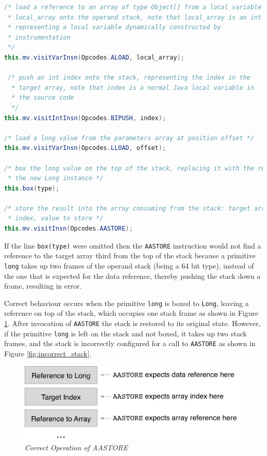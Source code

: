 \documentclass[]{final_report}
\begin{document}
\begin{lstlisting}[language=java,caption=Boxing a Primitive to a Reference in ASM, label={boxing}]
/* load a reference to an array of type Object[] from a local variable
 * local_array onto the operand stack, note that local_array is an int
 * representing a local variable dynamically constructed by
 * instrumentation
 */
this.mv.visitVarInsn(Opcodes.ALOAD, local_array);

 /* push an int index onto the stack, representing the index in the 
  * target array, note that index is a normal Java local variable in
  * the source code
  */
this.mv.visitIntInsn(Opcodes.BIPUSH, index);

/* load a long value from the parameters array at position offset */
this.mv.visitVarInsn(Opcodes.LLOAD, offset);

/* box the long value on the top of the stack, replacing it with the reference to
 * the new Long instance */
this.box(type);

/* store the result into the array consuming from the stack: target array reference,
 * index, value to store */
this.mv.visitInsn(Opcodes.AASTORE);
\end{lstlisting}

If the line \lstinline{box(type)}\noop{} were omitted then the \lstinline{AASTORE} instruction would not find a reference to the target array third from the top of the stack because a primitive \lstinline{long} takes up two frames of the operand stack (being a 64 bit type), instead of the one that is expected for the data reference, thereby pushing the stack down a frame, resulting in error.

Correct behaviour occurs when the primitive \lstinline{long} is boxed to \lstinline{Long}, leaving a reference on top of the stack, which occupies one stack frame as shown in Figure \ref{fig:correct_stack}. After invocation of \lstinline{AASTORE} the stack is restored to its original state. However, if the primitive \lstinline{long} is left on the stack and not boxed, it takes up two stack frames, and the stack is incorrectly configured for a call to \lstinline{AASTORE} as shown in Figure \ref{fig:incorrect_stack}.

\begin{figure}[!h]
\begin{center}
\includegraphics[scale=0.3]{figures/Correct_stack.pdf}
\caption{\small \sl Correct Operation of AASTORE \label{fig:correct_stack}}
\end{center} 
\end{figure}
\end{document}
